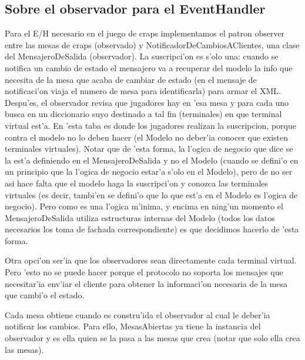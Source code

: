 \subsection{Sobre el observador para el EventHandler}
Para el E/H necesario en el juego de craps implementamos el patron observer entre las mesas de craps (observado) y NotificadorDeCambiosAClientes, una clase del MensajeroDeSalida (observador). La suscripci'on es s'olo una: cuando se notifica un cambio de estado el mensajero va a recuperar del modelo la info que necesita de la mesa que acaba de cambiar de estado (en el mensaje de notificaci'on viaja el numero de mesa para identificarla)  para armar el XML. Despu'es, el observador revisa que jugadores hay en 'esa mesa y para cada uno busca en un diccionario suyo destinado a tal fin (terminales) en que terminal virtual est'a. En 'esta taba es donde los jugadores realizan la suscripcion, porque contra el modelo no lo deben hacer (el Modelo no deber'ia conocer que existen terminales virtuales). Notar que de 'esta forma, la l'ogica de negocio que dice  se la est'a definiendo en el MensajeroDeSalida y no el Modelo (cuando se defini'o en un principio que la l'ogica de negocio estar'a s'olo en el Modelo), pero de no ser asi hace falta que el modelo haga la suscripci'on y conozca las terminales virtuales (es decir, tambi'en se defini'o que lo que est'a en el Modelo es l'ogica de negocio). Pero como es una l'ogica m'inima, y encima en ning'un momento el MensajeroDeSalida utiliza estructuras internas del Modelo (todos los datos necesarios los toma de fachada correspondiente) es que decidimos hacerlo de 'esta forma.

Otra opci'on ser'ia que los observadores sean directamente cada terminal virtual. Pero 'esto no se puede hacer porque el protocolo no soporta los mensajes que necesitar'ia env'iar el cliente para obtener la informaci'on necesaria de la mesa que cambi'o el estado.

Cada mesa obtiene cuando es constru'ida el observador al cual le deber'ia notificar los cambios. Para ello, MesasAbiertas ya tiene la instancia del observador y es ella quien se la pasa a las mesas que crea (notar que solo ella crea las mesas).

